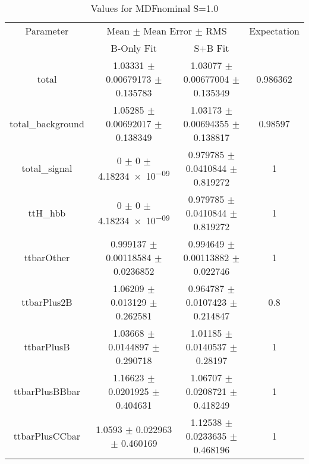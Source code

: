 \begin{table}
\centering
\caption{Values for MDFnominal S=1.0}
\begin{tabular}{cccc}
\toprule
Parameter & \multicolumn{2}{c}{Mean $\pm$ Mean Error $\pm$ RMS} & Expectation\\
 & B-Only Fit & S+B Fit & \\
\midrule
total & \num{1.03331} $\pm$ \num{0.00679173} $\pm$ \num{0.135783} & \num{1.03077} $\pm$ \num{0.00677004} $\pm$ \num{0.135349} & \num{0.986362}\\
total\_background & \num{1.05285} $\pm$ \num{0.00692017} $\pm$ \num{0.138349} & \num{1.03173} $\pm$ \num{0.00694355} $\pm$ \num{0.138817} & \num{0.98597}\\
total\_signal & \num{0} $\pm$ \num{0} $\pm$ \num{4.18234e-09} & \num{0.979785} $\pm$ \num{0.0410844} $\pm$ \num{0.819272} & \num{1}\\
ttH\_hbb & \num{0} $\pm$ \num{0} $\pm$ \num{4.18234e-09} & \num{0.979785} $\pm$ \num{0.0410844} $\pm$ \num{0.819272} & \num{1}\\
ttbarOther & \num{0.999137} $\pm$ \num{0.00118584} $\pm$ \num{0.0236852} & \num{0.994649} $\pm$ \num{0.00113882} $\pm$ \num{0.022746} & \num{1}\\
ttbarPlus2B & \num{1.06209} $\pm$ \num{0.013129} $\pm$ \num{0.262581} & \num{0.964787} $\pm$ \num{0.0107423} $\pm$ \num{0.214847} & \num{0.8}\\
ttbarPlusB & \num{1.03668} $\pm$ \num{0.0144897} $\pm$ \num{0.290718} & \num{1.01185} $\pm$ \num{0.0140537} $\pm$ \num{0.28197} & \num{1}\\
ttbarPlusBBbar & \num{1.16623} $\pm$ \num{0.0201925} $\pm$ \num{0.404631} & \num{1.06707} $\pm$ \num{0.0208721} $\pm$ \num{0.418249} & \num{1}\\
ttbarPlusCCbar & \num{1.0593} $\pm$ \num{0.022963} $\pm$ \num{0.460169} & \num{1.12538} $\pm$ \num{0.0233635} $\pm$ \num{0.468196} & \num{1}\\
\bottomrule
\end{tabular}
\end{table}